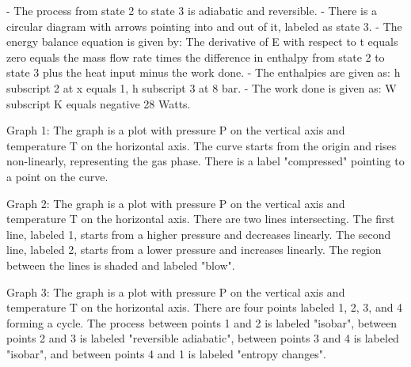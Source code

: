 - The process from state 2 to state 3 is adiabatic and reversible.
- There is a circular diagram with arrows pointing into and out of it, labeled as state 3.
- The energy balance equation is given by:
  The derivative of E with respect to t equals zero equals the mass flow rate times the difference in enthalpy from state 2 to state 3 plus the heat input minus the work done.
- The enthalpies are given as:
  h subscript 2 at x equals 1,
  h subscript 3 at 8 bar.
- The work done is given as:
  W subscript K equals negative 28 Watts.

Graph 1:
The graph is a plot with pressure P on the vertical axis and temperature T on the horizontal axis. The curve starts from the origin and rises non-linearly, representing the gas phase. There is a label "compressed" pointing to a point on the curve.

Graph 2:
The graph is a plot with pressure P on the vertical axis and temperature T on the horizontal axis. There are two lines intersecting. The first line, labeled 1, starts from a higher pressure and decreases linearly. The second line, labeled 2, starts from a lower pressure and increases linearly. The region between the lines is shaded and labeled "blow".

Graph 3:
The graph is a plot with pressure P on the vertical axis and temperature T on the horizontal axis. There are four points labeled 1, 2, 3, and 4 forming a cycle. The process between points 1 and 2 is labeled "isobar", between points 2 and 3 is labeled "reversible adiabatic", between points 3 and 4 is labeled "isobar", and between points 4 and 1 is labeled "entropy changes".